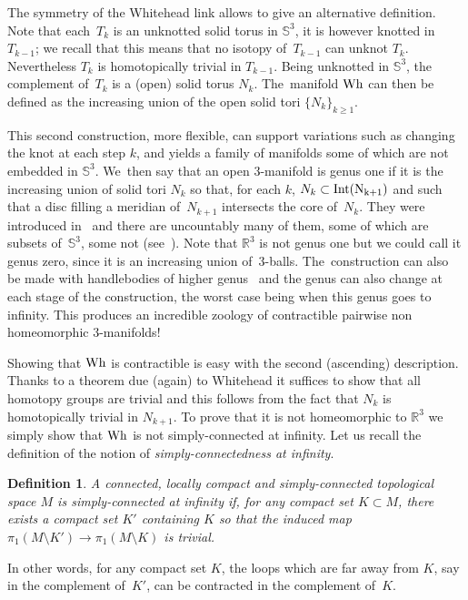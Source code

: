 \documentclass[pdftex]{sigma}
\numberwithin{equation}{section}
\newtheorem{defi}[theor]{Definition}
\begin{document}
The symmetry of the Whitehead link allows to give an alternative definition. Note that each~$T_{k}$ is an unknotted solid torus in $\mathbb{S}^{3}$, it is however knotted in $T_{k-1}$; we recall that this means that no isotopy of~$T_{k-1}$ can unknot $T_{k}$. Nevertheless $T_{k}$ is homotopically trivial in $T_{k-1}$. Being unknotted in $\mathbb{S}^{3}$, the complement of~$T_{k}$ is a (open) solid torus $N_{k}$. The~manifold $\rm Wh$ can then be defined as the increasing union of the open solid tori $\{N_{k}\}_{k\geq 1}$.

This second construction, more flexible, can support variations such as changing the knot at each step $k$, and yields a family of manifolds some of which are not embedded in $\mathbb{S}^{3}$. We~then say that an open $3$-manifold is genus one if it is the increasing union of solid tori $N_k$ so that, for each $k$, $N_k\subset \rm{Int}(N_{k+1})$ and such that a disc filling a meridian of~$N_{k+1}$ intersects the core of~$N_k$. They were introduced in~\cite{McMil} and there are uncountably many of them, some of which are subsets of~$\mathbb{S}^3$, some not (see~\cite{K-Mil}). Note that $\mathbb{R}^{3}$ is not genus one but we
could call it genus zero, since it is an increasing union of~$3$-balls. The~construction can also be made with handlebodies of higher genus~\cite{McMil} and the genus can also change at each stage of the construction, the worst case being when this genus goes to infinity. This produces an incredible zoology of contractible pairwise non homeomorphic $3$-manifolds!

Showing that $\rm Wh$ is contractible is easy with the second (ascending) description. Thanks to a theorem due (again) to Whitehead it suffices to show that all homotopy groups are trivial and this follows from the fact that $N_k$ is homotopically trivial in $N_{k+1}$. To prove that it is not homeomorphic to $\mathbb{R}^{3}$ we simply show that $\rm Wh$ is not simply-connected at infinity. Let us recall the definition of the notion of {\it simply-connectedness at infinity}.

\begin{defi}
A connected, locally compact and simply-connected topological space $M$ is \emph{simply-connected at infinity} if, for any compact set $K\subset M$, there exists a compact set $K'$ containing $K$ so that the induced map $\pi_{1}(M\setminus K')\rightarrow \pi_{1}(M\setminus K)$ is trivial.
\end{defi}

In other words, for any compact set $K$, the loops which are far away from $K$, say in the complement of~$K'$, can be contracted in the complement
of~$K$.
\end{document}
